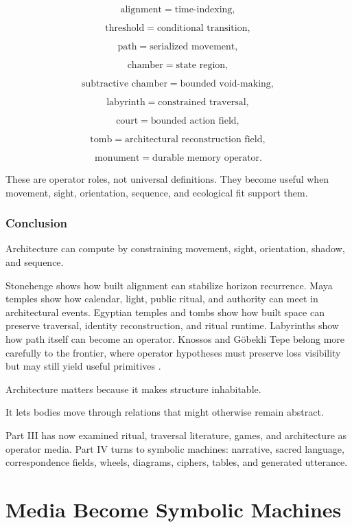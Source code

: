\documentclass[11pt]{book}
\begin{document}
\[
\text{alignment} = \text{time-indexing},
\]

\[
\text{threshold} = \text{conditional transition},
\]

\[
\text{path} = \text{serialized movement},
\]

\[
\text{chamber} = \text{state region},
\]

\[
\text{subtractive chamber} = \text{bounded void-making},
\]

\[
\text{labyrinth} = \text{constrained traversal},
\]

\[
\text{court} = \text{bounded action field},
\]

\[
\text{tomb} = \text{architectural reconstruction field},
\]

\[
\text{monument} = \text{durable memory operator}.
\]

These are operator roles, not universal definitions. They become useful when movement, sight, orientation, sequence, and ecological fit support them.

\section{Conclusion}

Architecture can compute by constraining movement, sight, orientation, shadow, and sequence.

Stonehenge shows how built alignment can stabilize horizon recurrence. Maya temples show how calendar, light, public ritual, and authority can meet in architectural events. Egyptian temples and tombs show how built space can preserve traversal, identity reconstruction, and ritual runtime. Labyrinths show how path itself can become an operator. Knossos and G\"obekli Tepe belong more carefully to the frontier, where operator hypotheses must preserve loss visibility but may still yield useful primitives \cite{Ruggles2005AncientAstronomy,Aveni2001Skywatchers,Coe2011Maya,Hornung1999BooksAfterlife}.

Architecture matters because it makes structure inhabitable.

It lets bodies move through relations that might otherwise remain abstract.

Part III has now examined ritual, traversal literature, games, and architecture as operator media. Part IV turns to symbolic machines: narrative, sacred language, correspondence fields, wheels, diagrams, ciphers, tables, and generated utterance.

\part{Media Become Symbolic Machines}
\end{document}
